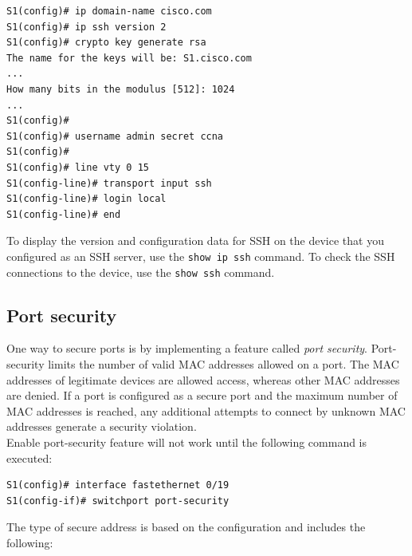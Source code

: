 \begin{verbatim}
S1(config)# ip domain-name cisco.com
S1(config)# ip ssh version 2
S1(config)# crypto key generate rsa
The name for the keys will be: S1.cisco.com
...
How many bits in the modulus [512]: 1024
...
S1(config)#
S1(config)# username admin secret ccna
S1(config)#
S1(config)# line vty 0 15
S1(config-line)# transport input ssh
S1(config-line)# login local
S1(config-line)# end
\end{verbatim}

To display the version and configuration data for SSH on the device that you configured as an SSH server, use the \verb|show ip ssh| command. To check the SSH connections
to the device, use the \verb|show ssh| command.

\subsection{Port security}

One way to secure ports is by implementing a feature called \emph{port security}. Port-security limits the number of valid MAC addresses allowed on a port.
The MAC addresses of legitimate devices are allowed access, whereas other MAC addresses are denied. If a port is configured as a secure port and the maximum number of MAC addresses is reached, any additional attempts to connect by unknown MAC addresses generate a security violation.\\

Enable port-security feature will not work until the following command is executed:

\begin{verbatim}
S1(config)# interface fastethernet 0/19
S1(config-if)# switchport port-security
\end{verbatim}

The type of secure address is based on the configuration and includes the following:

